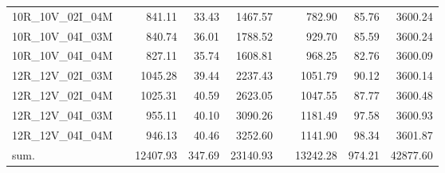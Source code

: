 \begin{tabular}{llrrrlrrr}
10R\_10V\_02I\_04M & \hspace{0.1cm} & 841.11 & 33.43 & 1467.57 & \hspace{0.2cm} & 782.90 & 85.76 & 3600.24\\
10R\_10V\_04I\_03M & \hspace{0.1cm} & 840.74 & 36.01 & 1788.52 & \hspace{0.2cm} & 929.70 & 85.59 & 3600.24\\
10R\_10V\_04I\_04M & \hspace{0.1cm} & 827.11 & 35.74 & 1608.81 & \hspace{0.2cm} & 968.25 & 82.76 & 3600.09\\
\addlinespace
12R\_12V\_02I\_03M & \hspace{0.1cm} & 1045.28 & 39.44 & 2237.43 & \hspace{0.2cm} & 1051.79 & 90.12 & 3600.14\\
12R\_12V\_02I\_04M & \hspace{0.1cm} & 1025.31 & 40.59 & 2623.05 & \hspace{0.2cm} & 1047.55 & 87.77 & 3600.48\\
12R\_12V\_04I\_03M & \hspace{0.1cm} & 955.11 & 40.10 & 3090.26 & \hspace{0.2cm} & 1181.49 & 97.58 & 3600.93\\
12R\_12V\_04I\_04M & \hspace{0.1cm} & 946.13 & 40.46 & 3252.60 & \hspace{0.2cm} & 1141.90 & 98.34 & 3601.87\\
\addlinespace
sum. & \hspace{0.1cm} & 12407.93 & 347.69 & 23140.93 & \hspace{0.2cm} & 13242.28 & 974.21 & 42877.60\\
\bottomrule
\end{tabular}
